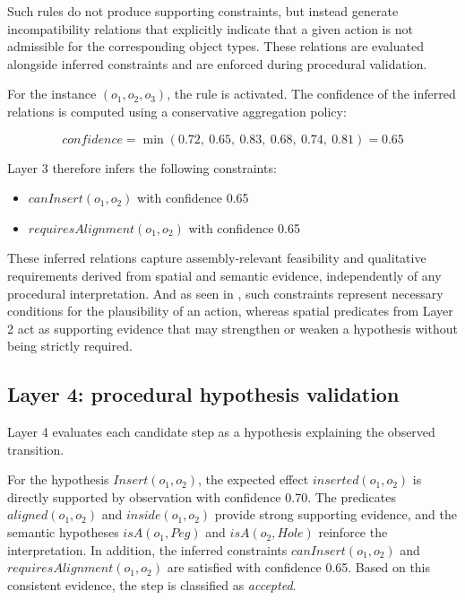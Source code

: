 \documentclass[11pt,titlepage,openright]{book}
\begin{document}
Such rules do not produce supporting constraints, but instead generate incompatibility relations that explicitly indicate that a given action is not admissible for the corresponding object types. These relations are evaluated alongside inferred constraints and are enforced during procedural validation.


For the instance $(o_1, o_2, o_3)$, the rule is activated. The confidence of the inferred relations is computed using a conservative aggregation policy:

\begin{equation*}
confidence = \min(0.72,\ 0.65,\ 0.83,\ 0.68,\ 0.74,\ 0.81) = 0.65
\end{equation*}

Layer 3 therefore infers the following constraints:

\begin{itemize}
\item $canInsert(o_1, o_2)$ with confidence 0.65
\item $requiresAlignment(o_1, o_2)$ with confidence 0.65
\end{itemize}

These inferred relations capture assembly-relevant feasibility and qualitative requirements derived from spatial and semantic evidence, independently of any procedural interpretation. And as seen in , such constraints represent necessary conditions for the plausibility of an action, whereas spatial predicates from Layer 2 act as supporting evidence that may strengthen or weaken a hypothesis without being strictly required.


\subsection{Layer 4: procedural hypothesis validation}

Layer 4 evaluates each candidate step as a hypothesis explaining the observed transition.

For the hypothesis $Insert(o_1, o_2)$, the expected effect $inserted(o_1, o_2)$ is directly supported by observation with confidence 0.70. The predicates $aligned(o_1, o_2)$ and $inside(o_1, o_2)$ provide strong supporting evidence, and the semantic hypotheses $isA(o_1, Peg)$ and $isA(o_2, Hole)$ reinforce the interpretation. In addition, the inferred constraints $canInsert(o_1, o_2)$ and $requiresAlignment(o_1, o_2)$ are satisfied with confidence 0.65. Based on this consistent evidence, the step is classified as \textit{accepted}.
\end{document}
